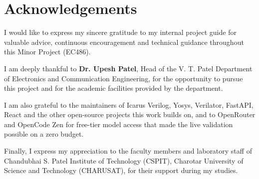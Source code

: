 \chapter*{\center \Large Acknowledgements}

I would like to express my sincere gratitude to my internal project guide for valuable advice, continuous encouragement and technical guidance throughout this Minor Project (EC486).

I am deeply thankful to \textbf{Dr. Upesh Patel}, Head of the V. T. Patel Department of Electronics and Communication Engineering, for the opportunity to pursue this project and for the academic facilities provided by the department.

I am also grateful to the maintainers of Icarus Verilog, Yosys, Verilator, FastAPI, React and the other open-source projects this work builds on, and to OpenRouter and OpenCode Zen for free-tier model access that made the live validation possible on a zero budget.

Finally, I express my appreciation to the faculty members and laboratory staff of Chandubhai S. Patel Institute of Technology (CSPIT), Charotar University of Science and Technology (CHARUSAT), for their support during my studies.
